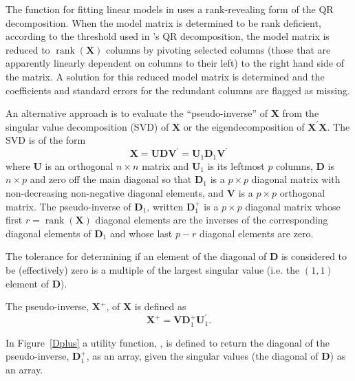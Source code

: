 \documentclass[shortnames,article]{jss}
\newcommand{\rank}{\operatorname{rank}}
\begin{document}
The  function for fitting linear models in  uses
a rank-revealing form of the QR decomposition.  When the model matrix
is determined to be rank deficient, according to the threshold used in
's QR decomposition, the model matrix is reduced to
$\rank{(\bm X)}$ columns by pivoting selected columns (those that are
apparently linearly dependent on columns to their left) to the right
hand side of the matrix.  A solution for this reduced model matrix is
determined and the coefficients and standard errors for the redundant
columns are flagged as missing.

An alternative approach is to evaluate the ``pseudo-inverse'' of $\bm
X$ from the singular value decomposition (SVD) of $\bm X$ or the
eigendecomposition of $\bm X^\prime\bm X$.  The SVD is of the form
\begin{displaymath}
  \bm X=\bm U\bm D\bm V^\prime=\bm U_1\bm D_1\bm V^\prime
\end{displaymath}
where $\bm U$ is an orthogonal $n\times n$ matrix and $\bm U_1$ is its
leftmost $p$ columns, $\bm D$ is $n\times p$ and zero off the main
diagonal so that $\bm D_1$ is a $p\times p$ diagonal matrix with
non-decreasing non-negative diagonal elements, and $\bm V$ is a $p\times
p$ orthogonal matrix.  The pseudo-inverse of $\bm D_1$, written $\bm
D_1^+$ is a $p\times p$ diagonal matrix whose first $r=\rank(\bm X)$
diagonal elements are the inverses of the corresponding diagonal
elements of $\bm D_1$ and whose last $p-r$ diagonal elements are zero.

The tolerance for determining if an element of the diagonal of $\bm D$
is considered to be (effectively) zero is a multiple of the largest
singular value (i.e. the $(1,1)$ element of $\bm D$).

The pseudo-inverse, $\bm X^+$, of $\bm X$ is defined as
\begin{displaymath}
  \bm X^+=\bm V\bm D_1^+\bm U_1^\prime .
\end{displaymath}

In Figure~\ref{Dplus} a utility function, , is defined to
return the diagonal of the pseudo-inverse, $\bm D_1^+$, as an array,
given the singular values (the diagonal of $\bm D$) as an array.
\end{document}
